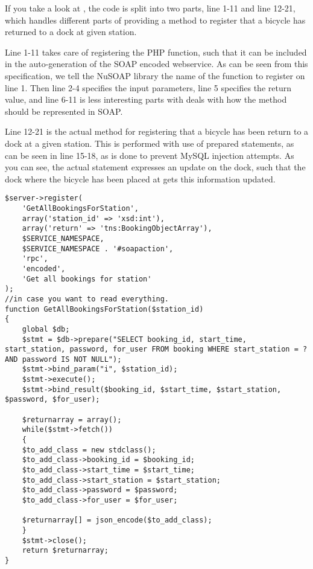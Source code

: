 If you take a look at , the code is split into two parts, line 1-11 and line 12-21, which handles different parts of providing a method to register that a bicycle has returned to a dock at given station.

Line 1-11 takes care of registering the PHP function, such that it can be included in the auto-generation of the SOAP encoded webservice.
As can be seen from this specification, we tell the NuSOAP library the name of the function to register on line 1.
Then line 2-4 specifies the input parameters, line 5 specifies the return value, and line 6-11 is less interesting parts with deals with how the method should be represented in SOAP.

Line 12-21 is the actual method for registering that a bicycle has been return to a dock at a given station.
This is performed with use of prepared statements, as can be seen in line 15-18, as is done to prevent MySQL injection attempts.
As you can see, the actual statement expresses an update on the dock, such that the dock where the bicycle has been placed at gets this information updated.

\begin{minipage}{\textwidth}
\begin{lstlisting}[caption = {Method for reading all bookings for a given station}, label = {lst:getallbookingstation}]
$server->register(
	'GetAllBookingsForStation',
	array('station_id' => 'xsd:int'),
	array('return' => 'tns:BookingObjectArray'),
	$SERVICE_NAMESPACE,
	$SERVICE_NAMESPACE . '#soapaction',
	'rpc',
	'encoded',
	'Get all bookings for station'
);
//in case you want to read everything.
function GetAllBookingsForStation($station_id)
{
	global $db;
	$stmt = $db->prepare("SELECT booking_id, start_time, start_station, password, for_user FROM booking WHERE start_station = ? AND password IS NOT NULL");
	$stmt->bind_param("i", $station_id);
	$stmt->execute();
	$stmt->bind_result($booking_id, $start_time, $start_station, $password, $for_user);
	
	$returnarray = array();
	while($stmt->fetch())
	{
	$to_add_class = new stdclass();
	$to_add_class->booking_id = $booking_id;
	$to_add_class->start_time = $start_time;
	$to_add_class->start_station = $start_station;
	$to_add_class->password = $password;
	$to_add_class->for_user = $for_user;
	
	$returnarray[] = json_encode($to_add_class);
	}
	$stmt->close();
	return $returnarray;
}
\end{lstlisting}
\end{minipage}

